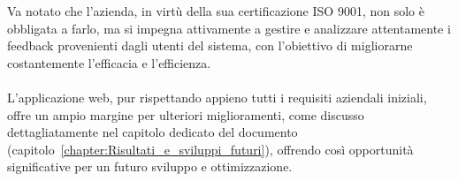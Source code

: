 Va notato che l'azienda, in virtù della sua certificazione ISO 9001, non solo è obbligata a farlo, 
ma si impegna attivamente a gestire e analizzare attentamente i feedback provenienti dagli utenti del sistema, 
con l'obiettivo di migliorarne costantemente l'efficacia e l'efficienza.
\\ \\
L'applicazione web, pur rispettando appieno tutti i requisiti aziendali iniziali, 
offre un ampio margine per ulteriori miglioramenti, come discusso dettagliatamente nel capitolo dedicato del documento (capitolo~\ref{chapter:Risultati_e_sviluppi_futuri}), 
offrendo così opportunità significative per un futuro sviluppo e ottimizzazione.